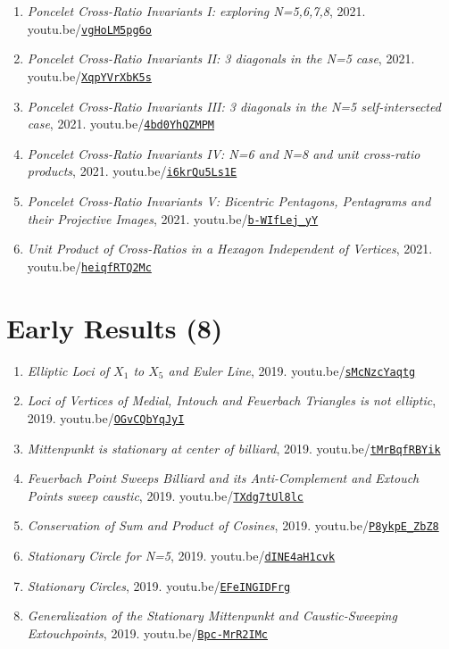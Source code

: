 \documentclass[12pt]{article}
\begin{document}
\begin{enumerate}[resume]
\item \textit{Poncelet Cross-Ratio Invariants I: exploring N=5,6,7,8}, 2021. youtu.be/\href{https://youtu.be/vgHoLM5pg6o}{\nolinkurl{vgHoLM5pg6o}}
\item \textit{Poncelet Cross-Ratio Invariants II: 3 diagonals in the N=5 case}, 2021. youtu.be/\href{https://youtu.be/XqpYVrXbK5s}{\nolinkurl{XqpYVrXbK5s}}
\item \textit{Poncelet Cross-Ratio Invariants III: 3 diagonals in the N=5 self-intersected case}, 2021. youtu.be/\href{https://youtu.be/4bd0YhQZMPM}{\nolinkurl{4bd0YhQZMPM}}
\item \textit{Poncelet Cross-Ratio Invariants IV: N=6 and N=8 and unit cross-ratio products}, 2021. youtu.be/\href{https://youtu.be/i6krQu5Ls1E}{\nolinkurl{i6krQu5Ls1E}}
\item \textit{Poncelet Cross-Ratio Invariants V: Bicentric Pentagons, Pentagrams and their Projective Images}, 2021. youtu.be/\href{https://youtu.be/b-WIfLej_yY}{\nolinkurl{b-WIfLej\_yY}}
\item \textit{Unit Product of Cross-Ratios in a Hexagon Independent of Vertices}, 2021. youtu.be/\href{https://youtu.be/heiqfRTQ2Mc}{\nolinkurl{heiqfRTQ2Mc}}
\end{enumerate}

\section{Early Results (8)}

\begin{enumerate}[resume]
\item \textit{Elliptic Loci of $X_{1}$ to $X_{5}$ and Euler Line}, 2019. youtu.be/\href{https://youtu.be/sMcNzcYaqtg}{\nolinkurl{sMcNzcYaqtg}}
\item \textit{Loci of Vertices of Medial, Intouch and Feuerbach Triangles is not elliptic}, 2019. youtu.be/\href{https://youtu.be/OGvCQbYqJyI}{\nolinkurl{OGvCQbYqJyI}}
\item \textit{Mittenpunkt is stationary at center of billiard}, 2019. youtu.be/\href{https://youtu.be/tMrBqfRBYik}{\nolinkurl{tMrBqfRBYik}}
\item \textit{Feuerbach Point Sweeps Billiard and its Anti-Complement and Extouch Points sweep caustic}, 2019. youtu.be/\href{https://youtu.be/TXdg7tUl8lc}{\nolinkurl{TXdg7tUl8lc}}
\item \textit{Conservation of Sum and Product of Cosines}, 2019. youtu.be/\href{https://youtu.be/P8ykpE_ZbZ8}{\nolinkurl{P8ykpE\_ZbZ8}}
\item \textit{Stationary Circle for N=5}, 2019. youtu.be/\href{https://youtu.be/dINE4aH1cvk}{\nolinkurl{dINE4aH1cvk}}
\item \textit{Stationary Circles}, 2019. youtu.be/\href{https://youtu.be/EFeINGIDFrg}{\nolinkurl{EFeINGIDFrg}}
\item \textit{Generalization of the Stationary Mittenpunkt and Caustic-Sweeping Extouchpoints}, 2019. youtu.be/\href{https://youtu.be/Bpc-MrR2IMc}{\nolinkurl{Bpc-MrR2IMc}}
\end{enumerate}
\end{document}
